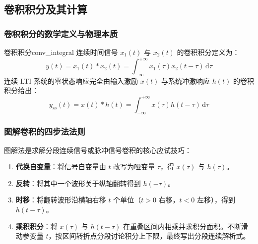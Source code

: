 \documentclass[11pt,a4paper,fontset=fandol]{ctexart}
\theoremstyle{remark}
\begin{document}
\subsection{卷积积分及其计算}

\subsubsection{卷积积分的数学定义与物理本质}
\begin{definition}{卷积积分}{conv_integral}
连续时间信号 $x_1(t)$ 与 $x_2(t)$ 的卷积积分定义为：
\begin{equation}
    y(t) = x_1(t) * x_2(t) = \int_{-\infty}^{+\infty} x_1(\tau)x_2(t - \tau)\,\mathrm{d}\tau
\end{equation}
连续 LTI 系统的零状态响应完全由输入激励 $x(t)$ 与系统冲激响应 $h(t)$ 的卷积积分给出：
\begin{equation}
    y_{\mathrm{zs}}(t) = x(t) * h(t) = \int_{-\infty}^{+\infty} x(\tau)h(t - \tau)\,\mathrm{d}\tau
\end{equation}
\end{definition}

\subsubsection{图解卷积的四步法法则}
图解法是求解分段连续信号或脉冲信号卷积的核心应试技巧：
\begin{enumerate}
    \item \textbf{代换自变量}：将信号自变量由 $t$ 改写为哑变量 $\tau$，得 $x(\tau)$ 与 $h(\tau)$。
    \item \textbf{反转}：将其中一个波形关于纵轴翻转得到 $h(-\tau)$。
    \item \textbf{时移}：将翻转波形沿横轴右移 $t$ 个单位（$t > 0$ 右移，$t < 0$ 左移），得到 $h(t - \tau)$。
    \item \textbf{乘积积分}：将 $x(\tau)$ 与 $h(t - \tau)$ 在重叠区间内相乘并求积分面积。不断滑动参变量 $t$，按区间转折点分段讨论积分上下限，最终写出分段连续解析式。
\end{enumerate}
\end{document}
